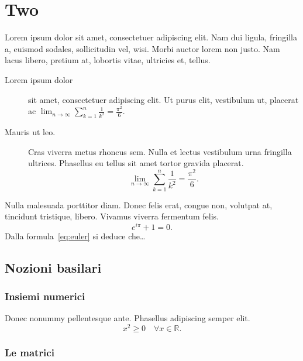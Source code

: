 
\chapter{Two}
\label{cap:two}


Lorem ipsum dolor sit amet, consectetuer adipiscing elit. Nam dui ligula, fringilla a, euismod sodales, sollicitudin vel, wisi. Morbi auctor lorem non justo. Nam lacus libero, pretium at, lobortis vitae, ultricies et, tellus.
\begin{description}
\item[Lorem ipsum dolor] sit amet, consectetuer adipiscing elit. Ut purus elit, vestibulum ut, placerat ac $\lim_{n \to \infty}\sum_{k=1}^n \frac{1}{k^2}= \frac{\pi^2}{6}$.
\item[Mauris ut leo.]
Cras viverra metus rhoncus sem. Nulla et lectus vestibulum urna fringilla ultrices. Phasellus eu tellus sit amet tortor gravida placerat.
\[
\lim_{n \to \infty}\sum_{k=1}^n \frac{1}{k^2}= \frac{\pi^2}{6}.
\]
\end{description}

Nulla malesuada porttitor diam. Donec felis erat, congue non, volutpat at, tincidunt tristique, libero. Vivamus viverra fermentum felis.
\begin{equation}
\label{eq:euler}
e^{i\pi}+1=0.
\end{equation}
Dalla formula~\eqref{eq:euler} 
si deduce che\dots






\section{Nozioni basilari}

\subsection{Insiemi numerici}

Donec nonummy pellentesque ante. Phasellus adipiscing semper elit.
\begin{equation}
x^2 \geq 0 \quad
\forall x \in \mathbb{R}.
\end{equation}


\subsection{Le matrici}

